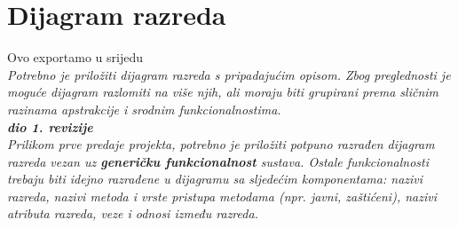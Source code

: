 			\eject
			
			
		\section{Dijagram razreda}
		
		    {\color{brown} Ovo exportamo u srijedu}\\
		
			\textit{Potrebno je priložiti dijagram razreda s pripadajućim opisom. Zbog preglednosti je moguće dijagram razlomiti na više njih, ali moraju biti grupirani prema sličnim razinama apstrakcije i srodnim funkcionalnostima.}\\
			
			\textbf{\textit{dio 1. revizije}}\\
			
			\textit{Prilikom prve predaje projekta, potrebno je priložiti potpuno razrađen dijagram razreda vezan uz \textbf{generičku funkcionalnost} sustava. Ostale funkcionalnosti trebaju biti idejno razrađene u dijagramu sa sljedećim komponentama: nazivi razreda, nazivi metoda i vrste pristupa metodama (npr. javni, zaštićeni), nazivi atributa razreda, veze i odnosi između razreda.}\\
			
			
			
			\eject

